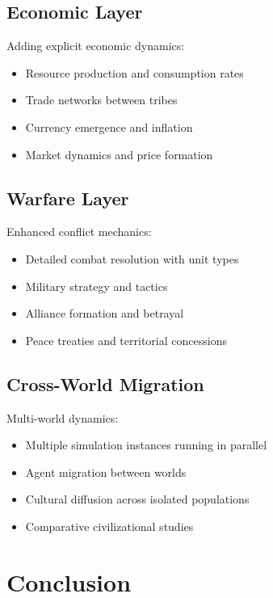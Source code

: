 \documentclass[11pt,a4paper]{article}
\begin{document}
\subsection{Economic Layer}

Adding explicit economic dynamics:

\begin{itemize}
    \item Resource production and consumption rates
    \item Trade networks between tribes
    \item Currency emergence and inflation
    \item Market dynamics and price formation
\end{itemize}

\subsection{Warfare Layer}

Enhanced conflict mechanics:

\begin{itemize}
    \item Detailed combat resolution with unit types
    \item Military strategy and tactics
    \item Alliance formation and betrayal
    \item Peace treaties and territorial concessions
\end{itemize}

\subsection{Cross-World Migration}

Multi-world dynamics:

\begin{itemize}
    \item Multiple simulation instances running in parallel
    \item Agent migration between worlds
    \item Cultural diffusion across isolated populations
    \item Comparative civilizational studies
\end{itemize}

\section{Conclusion}
\end{document}
